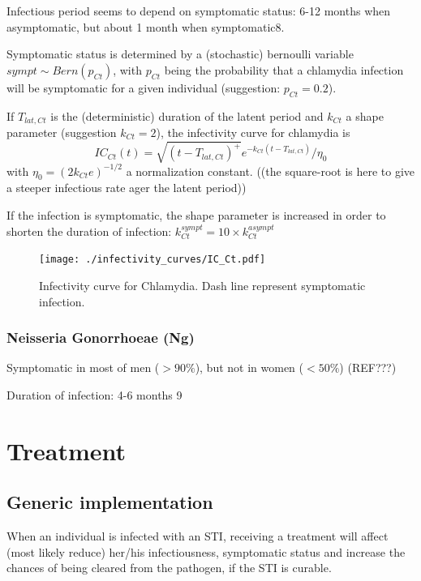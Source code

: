 \documentclass[11pt, onecolumn]{article}
\begin{document}
Infectious period seems to depend on symptomatic status: 6-12 months when asymptomatic, but about 1 month when symptomatic8.

Symptomatic status is determined by a (stochastic) bernoulli variable $sympt\sim Bern(p_{Ct})$, with $p_{Ct}$ being the probability that a chlamydia infection will be symptomatic for a given individual (suggestion: $p_{Ct}=0.2$).

If $T_{lat,Ct}$ is the (deterministic) duration of the latent period and $k_{Ct}$ a shape parameter (suggestion $k_{Ct}=2$), the infectivity curve for chlamydia is
$$IC_{Ct}(t) = \sqrt{(t-T_{lat,Ct})^+}e^{-k_{Ct} (t-T_{lat,Ct})}/\eta_0$$
with $\eta_0=(2k_{Ct}e)^{-1/2}$ a normalization constant. ((the square-root is here to give a steeper infectious rate ager the latent period))

If the infection is symptomatic, the shape parameter is increased in order to shorten the duration of infection: $k_{Ct}^{sympt} =10\times k_{Ct}^{asympt}$

\begin{figure}[!ht]
\centering
    \texttt{[image: ./infectivity\_curves/IC\_Ct.pdf]}
\caption{Infectivity curve for Chlamydia. Dash line represent symptomatic infection.}
\label{fig:ICCt}
\end{figure}



\subsubsection{Neisseria Gonorrhoeae (Ng)}

 Symptomatic in most of men ($> 90\%$), but not in women ($< 50\%$) (REF???)
 
 Duration of infection: 4-6 months 9
 


\section{Treatment}


\subsection{Generic implementation}

When an individual is infected with an STI, receiving a treatment will affect (most likely reduce) her/his infectiousness, symptomatic status and increase the chances of being cleared from the pathogen, if the STI is curable.
\end{document}
